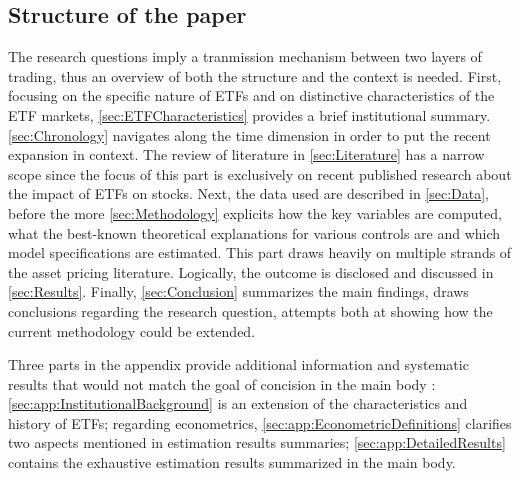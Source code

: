\subsection{Structure of the paper}
The research questions imply a tranmission mechanism between two layers of trading, thus an overview of both the structure and the context is needed. First, focusing on the specific nature of ETFs and on distinctive characteristics of the ETF markets, \autoref{sec:ETFCharacteristics} provides a brief institutional summary. \autoref{sec:Chronology} navigates along the time dimension in order to put the recent expansion in context. The review of literature in \autoref{sec:Literature} has a narrow scope since the focus of this part is exclusively on recent published research about the impact of ETFs on stocks. Next, the data used are described in \autoref{sec:Data}, before the more \autoref{sec:Methodology} explicits how the key variables are computed, what the best-known theoretical explanations for various controls are and which model specifications are estimated. This part draws heavily on multiple strands of the asset pricing literature. Logically, the outcome is disclosed and discussed in \autoref{sec:Results}. Finally, \autoref{sec:Conclusion} summarizes the main findings, draws conclusions regarding the research question, attempts both at showing how the current methodology could be extended.

Three parts in the appendix provide additional information and systematic results that would not match the goal of concision in the main body : \autoref{sec:app:InstitutionalBackground} is an extension of the characteristics and history of ETFs; regarding econometrics, \autoref{sec:app:EconometricDefinitions} clarifies two aspects mentioned in estimation results summaries; \autoref{sec:app:DetailedResults} contains the exhaustive estimation results summarized in the main body.
